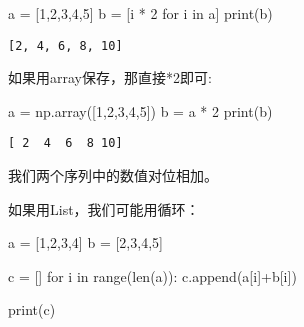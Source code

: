 \documentclass[
  letterpaper,
  DIV=11,
  numbers=noendperiod]{scrreprt}
\newenvironment{Shaded}{\begin{snugshade}}{\end{snugshade}}
\newcommand{\BuiltInTok}[1]{\textcolor[rgb]{0.00,0.23,0.31}{#1}}
\newcommand{\ControlFlowTok}[1]{\textcolor[rgb]{0.00,0.23,0.31}{#1}}
\newcommand{\DecValTok}[1]{\textcolor[rgb]{0.68,0.00,0.00}{#1}}
\newcommand{\KeywordTok}[1]{\textcolor[rgb]{0.00,0.23,0.31}{#1}}
\newcommand{\NormalTok}[1]{\textcolor[rgb]{0.00,0.23,0.31}{#1}}
\newcommand{\OperatorTok}[1]{\textcolor[rgb]{0.37,0.37,0.37}{#1}}
\begin{document}
\begin{Shaded}
\begin{Highlighting}[]
\NormalTok{a }\OperatorTok{=}\NormalTok{ [}\DecValTok{1}\NormalTok{,}\DecValTok{2}\NormalTok{,}\DecValTok{3}\NormalTok{,}\DecValTok{4}\NormalTok{,}\DecValTok{5}\NormalTok{]}
\NormalTok{b }\OperatorTok{=}\NormalTok{ [i }\OperatorTok{*} \DecValTok{2} \ControlFlowTok{for}\NormalTok{ i }\KeywordTok{in}\NormalTok{ a]}
\BuiltInTok{print}\NormalTok{(b)}
\end{Highlighting}
\end{Shaded}

\begin{verbatim}
[2, 4, 6, 8, 10]
\end{verbatim}

如果用array保存，那直接*2即可:

\begin{Shaded}
\begin{Highlighting}[]
\NormalTok{a }\OperatorTok{=}\NormalTok{ np.array([}\DecValTok{1}\NormalTok{,}\DecValTok{2}\NormalTok{,}\DecValTok{3}\NormalTok{,}\DecValTok{4}\NormalTok{,}\DecValTok{5}\NormalTok{])}
\NormalTok{b }\OperatorTok{=}\NormalTok{ a }\OperatorTok{*} \DecValTok{2}
\BuiltInTok{print}\NormalTok{(b)}
\end{Highlighting}
\end{Shaded}

\begin{verbatim}
[ 2  4  6  8 10]
\end{verbatim}

我们两个序列中的数值对位相加。

如果用List，我们可能用循环：

\begin{Shaded}
\begin{Highlighting}[]
\NormalTok{a }\OperatorTok{=}\NormalTok{ [}\DecValTok{1}\NormalTok{,}\DecValTok{2}\NormalTok{,}\DecValTok{3}\NormalTok{,}\DecValTok{4}\NormalTok{]}
\NormalTok{b }\OperatorTok{=}\NormalTok{ [}\DecValTok{2}\NormalTok{,}\DecValTok{3}\NormalTok{,}\DecValTok{4}\NormalTok{,}\DecValTok{5}\NormalTok{]}

\NormalTok{c }\OperatorTok{=}\NormalTok{ []}
\ControlFlowTok{for}\NormalTok{ i }\KeywordTok{in} \BuiltInTok{range}\NormalTok{(}\BuiltInTok{len}\NormalTok{(a)):}
\NormalTok{  c.append(a[i]}\OperatorTok{+}\NormalTok{b[i])}

\BuiltInTok{print}\NormalTok{(c)}
\end{Highlighting}
\end{Shaded}
\end{document}
